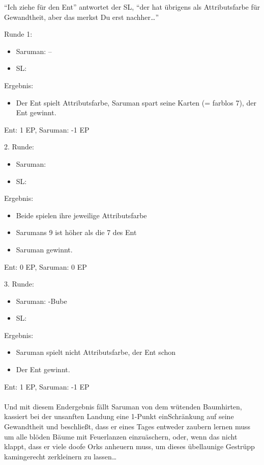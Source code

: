 "`Ich ziehe für den Ent"' antwortet der SL, "`der hat übrigens \pik als Attributsfarbe für Gewandtheit, aber das merkst Du erst nachher\dots"'

Runde 1:
\begin {itemize}
\item Saruman: --
\item SL: 
\end {itemize}

Ergebnis: 
\begin {itemize}
\item Der Ent spielt Attributsfarbe, Saruman spart seine Karten (= farblos 7), der Ent gewinnt. 
\end {itemize}
Ent: 1 EP, Saruman: -1 EP

2. Runde:
\begin {itemize}
\item Saruman: 
\item SL: 
\end {itemize}

Ergebnis:
\begin {itemize}
\item Beide spielen ihre jeweilige Attributsfarbe
\item Sarumans 9 ist höher als die 7 des Ent
\item Saruman gewinnt.
\end {itemize}
Ent: 0 EP, Saruman: 0 EP

3. Runde:
\begin {itemize}
\item Saruman: \karo-Bube
\item SL: 
\end {itemize}

Ergebnis:
\begin {itemize}
\item Saruman spielt nicht Attributsfarbe, der Ent schon
\item Der Ent gewinnt.
\end {itemize}
Ent: 1 EP, Saruman: -1 EP
\\
\\
Und mit diesem Endergebnis fällt Saruman von dem wütenden Baumhirten, kassiert bei der unsanften Landung eine 1-Punkt einSchränkung auf seine Gewandtheit und beschließt, dass er eines Tages entweder zaubern lernen muss um alle blöden Bäume mit Feuerlanzen einzuäschern, oder, wenn das nicht klappt, dass er viele doofe Orks anheuern muss, um dieses übellaunige Gestrüpp kamingerecht zerkleinern zu lassen\dots


